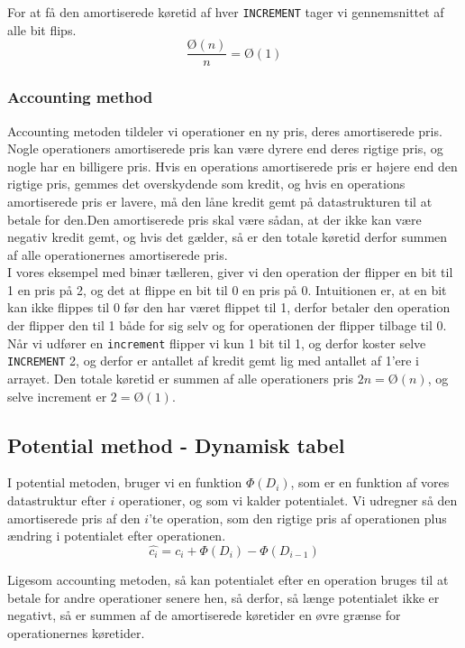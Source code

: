 For at få den amortiserede køretid af hver \texttt{INCREMENT} tager vi gennemsnittet af alle bit flips.
$$\frac{Ø(n)}{n} = Ø(1)$$

\subsubsection{Accounting method}
Accounting metoden tildeler vi operationer en ny pris, deres amortiserede pris. Nogle operationers amortiserede pris kan være dyrere end deres rigtige pris, og nogle har en billigere pris. Hvis en operations amortiserede pris er højere end den rigtige pris, gemmes det overskydende som kredit, og hvis en operations amortiserede pris er lavere, må den låne kredit gemt på datastrukturen til at betale for den.Den amortiserede pris skal være sådan, at der ikke kan være negativ kredit gemt, og hvis det gælder, så er den totale køretid derfor summen af alle operationernes amortiserede pris.\\

I vores eksempel med binær tælleren, giver vi den operation der flipper en bit til 1 en pris på 2, og det at flippe en bit til 0 en pris på 0. Intuitionen er, at en bit kan ikke flippes til 0 før den har været flippet til 1, derfor betaler den operation der flipper den til 1 både for sig selv og for operationen der flipper tilbage til 0. Når vi udfører en \texttt{increment} flipper vi kun 1 bit til 1, og derfor koster selve \texttt{INCREMENT} 2, og derfor er antallet af kredit gemt lig med antallet af 1'ere i arrayet. Den totale køretid er summen af alle operationers pris $2n = Ø(n)$, og selve increment er $2 = Ø(1)$.

\subsection{Potential method - Dynamisk tabel}
I potential metoden, bruger vi en funktion $\Phi(D_i)$, som er en funktion af vores datastruktur efter $i$ operationer, og som vi kalder potentialet. Vi udregner så den amortiserede pris af den  $i$'te operation, som den rigtige pris af operationen plus ændring i potentialet efter operationen.
$$\hat{c_i} = c_i + \Phi(D_i) - \Phi(D_{i - 1})$$

Ligesom accounting metoden, så kan potentialet efter en operation bruges til at betale for andre operationer senere hen, så derfor, så længe potentialet ikke er negativt, så er summen af de amortiserede køretider en øvre grænse for operationernes køretider.\\


